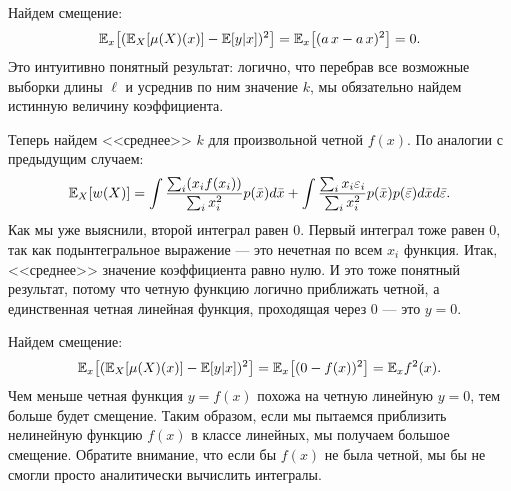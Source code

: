 \documentclass[12pt,fleqn]{article}
\begin{document}
\begin{esSolution}
    Найдем смещение:
    \[
    \mathbb{E}_{x}\bigl[(\mathbb{E}_{X}[\mu(X)(x)] - \mathbb{E}[y|x] )^2\bigr] = \mathbb{E}_{x}\bigl[(a\,x -  a\, x )^2\bigr] = 0.
    \]
    Это интуитивно понятный результат: логично, что перебрав все возможные выборки длины $\ell$ и усреднив по ним значение $k$, мы обязательно найдем истинную величину коэффициента.
    
    Теперь найдем <<среднее>> $k$ для произвольной четной  $f(x)$. По аналогии с предыдущим случаем:
    \[
    \mathbb{E}_{X}[w(X)] = 
    \int \frac{\sum_i ( x_i f(x_i)) }{\sum_i x_i^2}  p(\bar x)  d\bar x  +
    \int \frac{\sum_i x_i \varepsilon_i}{\sum_i x_i^2}  p(\bar x)  p(\bar \varepsilon)  d \bar x d \bar \varepsilon.
    \]  
    Как мы уже выяснили, второй интеграл равен 0. Первый интеграл тоже равен 0, так как подынтегральное выражение --- это нечетная по всем $x_i$ функция. Итак, <<среднее>> значение коэффициента равно нулю. И это тоже понятный результат, потому что четную функцию логично приближать четной, а единственная четная линейная функция, проходящая через 0 --- это $y = 0$.
    
    Найдем смещение:
    \[
    \mathbb{E}_{x}\bigl[(\mathbb{E}_{X}[\mu(X)(x)] - \mathbb{E}[y|x] )^2\bigr] = \mathbb{E}_{x}\bigl[(0 -  f(x))^2\bigr] = 
    \mathbb{E}_x f^2(x).
    \]
    Чем меньше четная функция $y=f(x)$ похожа на четную линейную $y = 0$, тем больше будет смещение. Таким образом, если мы пытаемся приблизить нелинейную функцию $f(x)$ в классе линейных, мы получаем большое смещение. Обратите внимание, что если бы $f(x)$ не была четной, мы бы не смогли просто аналитически вычислить интегралы.  
\end{esSolution}
\end{document}
